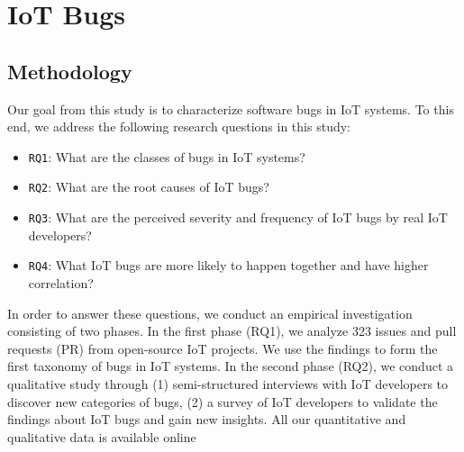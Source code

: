
\chapter{IoT Bugs}
\label{ch:bugs}

\section{Methodology}
Our goal from this study is to characterize software bugs in IoT systems. To this end, we address the following research questions in this study:
\begin{itemize}
\item {\verb|RQ1|}: What are the classes of bugs in IoT systems?
\item {\verb|RQ2|}: What are the root causes of IoT bugs?
\item {\verb|RQ3|}: What are the perceived severity and frequency of IoT bugs by real IoT developers?
\item {\verb|RQ4|}: What IoT bugs are more likely to happen together and have higher correlation?
\end{itemize}
In order to answer these questions, we conduct an empirical investigation consisting of two phases. In the first phase (RQ1), we analyze 323 issues and pull requests (PR) from open-source IoT projects. We use the findings to form the first taxonomy of bugs in IoT systems. In the second phase (RQ2), we conduct a qualitative study through (1) semi-structured interviews with IoT developers to discover new categories of bugs, (2) a survey of IoT developers to validate the findings about IoT bugs and gain new insights. All our quantitative and qualitative data is available online~\cite{repPack} 


